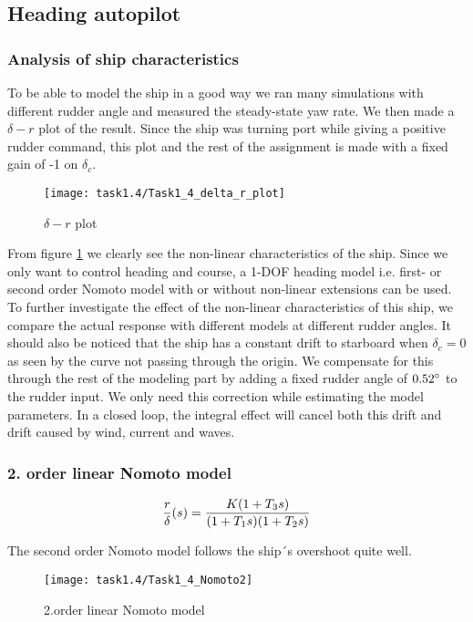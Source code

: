 \subsection{Heading autopilot}\label{subsec:prob1.1}
\subsubsection*{Analysis of ship characteristics}
To be able to model the ship in a good way we ran many simulations with different rudder angle and measured the steady-state yaw rate. We then made a $\delta-r$ plot of the result. Since the ship was turning port while giving a positive rudder command, this plot and the rest of the assignment is made with a fixed gain of -1 on $\delta_c$.
\begin{figure}[H]
    \centering
    \texttt{[image: task1.4/Task1\_4\_delta\_r\_plot]}
    \caption{$\delta - r$ plot}
    \label{fig:delta-r-plot}
\end{figure}
From figure \ref{fig:delta-r-plot} we clearly see the non-linear characteristics of the ship. Since we only want to control heading and course, a 1-DOF heading model i.e. first- or second order Nomoto model with or without non-linear extensions can be used. To further investigate the effect of the non-linear characteristics of this ship, we compare the actual response with different models at different rudder angles. It should also be noticed that the ship has a constant drift to starboard when $\delta_c=0$ as seen by the curve not passing through the origin. We compensate for this through the rest of the modeling part by adding a fixed rudder angle of $0.52\degree$ to the rudder input. We only need this correction while estimating the model parameters. In a closed loop, the integral effect will cancel both this drift and drift caused by wind, current and waves.

\subsubsection*{2. order linear Nomoto model}

\begin{equation}
	\frac{r}{\delta}(s) = \frac{K(1+T_3 s)}{(1+T_1 s) (1+T_2 s) } \\
\end{equation}

The second order Nomoto model follows the ship´s overshoot quite well. 

\begin{figure}[H]
    \centering
    \texttt{[image: task1.4/Task1\_4\_Nomoto2]}
    \caption{2.order linear Nomoto model}
    \label{fig:nomoto2_lin}
\end{figure}

